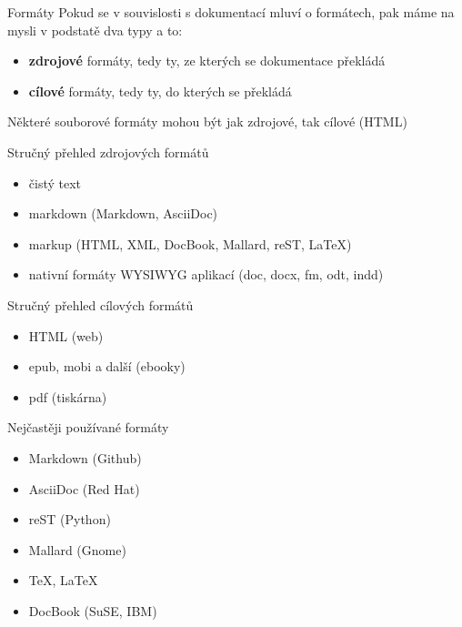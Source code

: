 \documentclass[12pt]{beamer}
\begin{document}
	\begin{frame}{Formáty}
	Pokud se v souvislosti s dokumentací mluví o formátech, pak máme na mysli v podstatě dva typy a to:
		\begin{itemize}
			\item \textbf{zdrojové} formáty, tedy ty, ze kterých se dokumentace překládá
			\item \textbf{cílové} formáty, tedy ty, do kterých se překládá
		\end{itemize}
	Některé souborové formáty mohou být jak zdrojové, tak cílové (HTML)
	\end{frame}

	\begin{frame}{Stručný přehled zdrojových formátů}
		\begin{itemize}
			\item čistý text
			\item markdown (Markdown, AsciiDoc)
			\item markup (HTML, XML, DocBook, Mallard, reST, \LaTeX)
			\item nativní formáty WYSIWYG aplikací (doc, docx, fm, odt, indd)
		\end{itemize}
	\end{frame}

	\begin{frame}{Stručný přehled cílových formátů}
		\begin{itemize}
			\item HTML (web)
			\item epub, mobi a další (ebooky)
			\item pdf (tiskárna)
		\end{itemize}
	\end{frame}

	\begin{frame}{Nejčastěji používané formáty}
		\begin{itemize}
			\item Markdown (Github)
			\item AsciiDoc (Red Hat)
			\item reST (Python)
			\item Mallard (Gnome)
			\item \TeX, \LaTeX
			\item DocBook (SuSE, IBM)
		\end{itemize}
	\end{frame}
\end{document}
